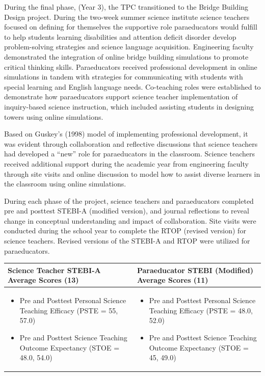 \documentclass[11.5pt]{sig-alternate} %
\begin{document}
\begin{large}
During the final phase, (Year 3), the TPC transitioned to the Bridge Building Design project. During the two-week summer science institute science teachers focused on defining for themselves the supportive role paraeducators would fulfill to help students learning disabilities and attention deficit disorder develop problem-solving strategies and science language acquisition. Engineering faculty demonstrated the integration of online bridge building simulations to promote critical thinking skills.  Paraeducators received professional development in online simulations in tandem with strategies for communicating with students with special learning and English language needs. Co-teaching roles were established to demonstrate how paraeducators support science teacher implementation of inquiry-based science instruction, which included assisting students in designing towers using online simulations. 

Based on Guskey’s (1998) model of implementing professional development, it was evident through collaboration and reflective discussions that science teachers had developed a “new” role for paraeducators in the classroom. Science teachers received additional support during the academic year from engineering faculty through site visits and online discussion to model how to assist diverse learners in the classroom using online simulations.

During each phase of the project, science teachers and paraeducators completed pre and posttest STEBI-A (modified version), and journal reflections to reveal change in conceptual understanding and impact of collaboration. Site visits were conducted during the school year to complete the RTOP (revised version) for science teachers. Revised versions of the STEBI-A and RTOP were utilized for paraeducators.

\begin{table}[th]
\begin{tabular}{|l|l|}
\hline
Science Teacher STEBI-A Average Scores (13) & Paraeducator STEBI (Modified) Average Scores (11) \\ \hline
\begin{itemize}
    \item Pre and Posttest Personal Science Teaching Efficacy (PSTE = 55, 57.0)
    \item Pre and Posttest Science Teaching Outcome Expectancy (STOE = 48.0, 54.0)
\end{itemize} &
\begin{itemize}
    \item Pre and Posttest Personal Science Teaching Efficacy (PSTE = 48.0, 52.0)
    \item Pre and Posttest Science Teaching Outcome Expectancy (STOE = 45, 49.0)
\end{itemize} \\ \hline
\end{tabular}
\end{table}


\end{large}
\end{document}
